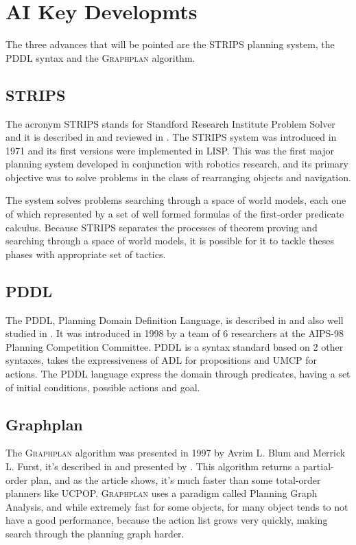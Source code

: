 \section*{AI Key Developmts}\label{sec:ai_key_dev}

The three advances that will be pointed are the STRIPS planning system, the PDDL syntax and the \textsc{Graphplan} algorithm.

\subsection*{STRIPS}\label{subsec:strips}

The acronym STRIPS stands for Standford Research Institute Problem Solver and it is described in \cite{strips1} and reviewed in \cite{strips2}. The STRIPS system was introduced in 1971 and its first versions were implemented in LISP. This was the first major planning system developed in conjunction with robotics research, and its primary objective was to solve problems in the class of rearranging objects and navigation.

The system solves problems searching through a space of world models, each one of which represented by a set of well formed formulas of the first-order predicate calculus. Because STRIPS separates the processes of theorem proving and searching through a space of world models, it is possible for it to tackle theses phases with appropriate set of tactics. 

\subsection*{PDDL}

The PDDL, Planning Domain Definition Language, is described in \cite{pddl} and also well studied in \cite{aima}. It was introduced in 1998 by a team of 6 researchers at the AIPS-98 Planning Competition Committee. PDDL is a syntax standard based on 2 other syntaxes, takes the expressiveness of ADL for propositions and UMCP for actions. The PDDL language express the domain through predicates, having a set of initial conditions, possible actions and goal.

\subsection*{Graphplan}

The \textsc{Graphplan} algorithm was presented in 1997 by Avrim L. Blum and Merrick L. Furst, it's described in \cite{praphplan} and presented by \cite{aima}. This algorithm returns a partial-order plan, and as the article shows, it's much faster than some total-order planners like UCPOP. \textsc{Graphplan} uses a paradigm called Planning Graph Analysis, and while extremely fast for some objects, for many object tends to not have a good performance, because the action list grows very quickly, making search through the planning graph harder.